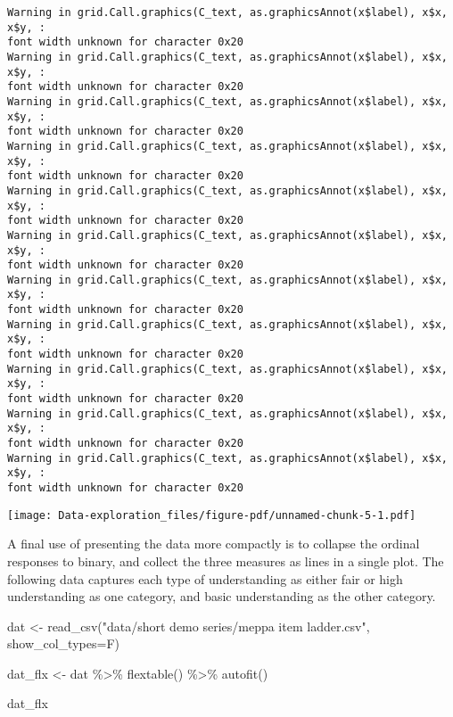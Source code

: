 \documentclass[
  letterpaper,
  DIV=11,
  numbers=noendperiod]{scrreprt}
\newenvironment{Shaded}{\begin{snugshade}}{\end{snugshade}}
\newcommand{\AttributeTok}[1]{\textcolor[rgb]{0.40,0.45,0.13}{#1}}
\newcommand{\FunctionTok}[1]{\textcolor[rgb]{0.28,0.35,0.67}{#1}}
\newcommand{\NormalTok}[1]{\textcolor[rgb]{0.00,0.23,0.31}{#1}}
\newcommand{\OtherTok}[1]{\textcolor[rgb]{0.00,0.23,0.31}{#1}}
\newcommand{\SpecialCharTok}[1]{\textcolor[rgb]{0.37,0.37,0.37}{#1}}
\newcommand{\StringTok}[1]{\textcolor[rgb]{0.13,0.47,0.30}{#1}}
\begin{document}
\begin{verbatim}
Warning in grid.Call.graphics(C_text, as.graphicsAnnot(x$label), x$x, x$y, :
font width unknown for character 0x20
Warning in grid.Call.graphics(C_text, as.graphicsAnnot(x$label), x$x, x$y, :
font width unknown for character 0x20
Warning in grid.Call.graphics(C_text, as.graphicsAnnot(x$label), x$x, x$y, :
font width unknown for character 0x20
Warning in grid.Call.graphics(C_text, as.graphicsAnnot(x$label), x$x, x$y, :
font width unknown for character 0x20
Warning in grid.Call.graphics(C_text, as.graphicsAnnot(x$label), x$x, x$y, :
font width unknown for character 0x20
Warning in grid.Call.graphics(C_text, as.graphicsAnnot(x$label), x$x, x$y, :
font width unknown for character 0x20
Warning in grid.Call.graphics(C_text, as.graphicsAnnot(x$label), x$x, x$y, :
font width unknown for character 0x20
Warning in grid.Call.graphics(C_text, as.graphicsAnnot(x$label), x$x, x$y, :
font width unknown for character 0x20
Warning in grid.Call.graphics(C_text, as.graphicsAnnot(x$label), x$x, x$y, :
font width unknown for character 0x20
Warning in grid.Call.graphics(C_text, as.graphicsAnnot(x$label), x$x, x$y, :
font width unknown for character 0x20
Warning in grid.Call.graphics(C_text, as.graphicsAnnot(x$label), x$x, x$y, :
font width unknown for character 0x20
\end{verbatim}

\texttt{[image: Data-exploration\_files/figure-pdf/unnamed-chunk-5-1.pdf]}

A final use of presenting the data more compactly is to collapse the
ordinal responses to binary, and collect the three measures as lines in
a single plot. The following data captures each type of understanding as
either fair or high understanding as one category, and basic
understanding as the other category.

\begin{Shaded}
\begin{Highlighting}[]
\NormalTok{dat }\OtherTok{\textless{}{-}} \FunctionTok{read\_csv}\NormalTok{(}\StringTok{"data/short demo series/meppa item ladder.csv"}\NormalTok{,}
                \AttributeTok{show\_col\_types=}\NormalTok{F)}

\NormalTok{dat\_flx }\OtherTok{\textless{}{-}}\NormalTok{ dat }\SpecialCharTok{\%\textgreater{}\%}
  \FunctionTok{flextable}\NormalTok{() }\SpecialCharTok{\%\textgreater{}\%}
  \FunctionTok{autofit}\NormalTok{() }

\NormalTok{dat\_flx}
\end{Highlighting}
\end{Shaded}
\end{document}
